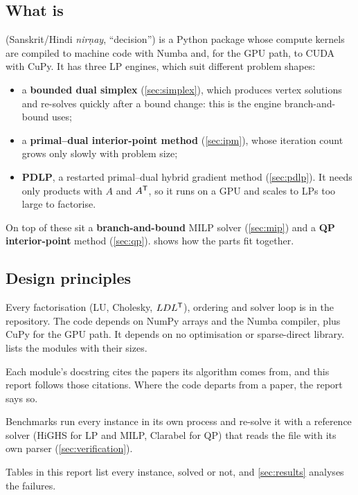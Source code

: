 \subsection{What \nirnay{} is}
\nirnay{} (Sanskrit/Hindi \emph{nirṇay}, ``decision'') is a Python package whose compute
kernels are compiled to machine code with Numba and, for the GPU path, to CUDA with CuPy. It has
three LP engines, which suit different problem shapes:
\begin{itemize}
  \item a \textbf{bounded dual simplex} (\cref{sec:simplex}), which produces vertex solutions and
        re-solves quickly after a bound change: this is the engine branch-and-bound uses;
  \item a \textbf{primal--dual interior-point method} (\cref{sec:ipm}), whose iteration count
        grows only slowly with problem size;
  \item \textbf{PDLP}, a restarted primal--dual hybrid gradient method (\cref{sec:pdlp}). It needs
        only products with $A$ and $A^{\mathsf{T}}$, so it runs on a GPU and scales to LPs too large to
        factorise.
\end{itemize}
On top of these sit a \textbf{branch-and-bound} MILP solver (\cref{sec:mip}) and a \textbf{QP
interior-point} method (\cref{sec:qp}).  shows how the parts fit together.

\subsection{Design principles}
\begin{description}[style=nextline,leftmargin=1.2em,font=\sffamily\bfseries\color{navy}]
  \item[Implement, do not wrap.] Every factorisation (LU, Cholesky, $LDL^{\mathsf{T}}$), ordering and
        solver loop is in the repository. The code depends on NumPy arrays and the Numba
        compiler, plus CuPy for the GPU path. It depends on no optimisation or sparse-direct
        library.  lists the modules with their sizes.
  \item[Follow the primary literature.] Each module's docstring cites the papers its algorithm
        comes from, and this report follows those citations. Where the code departs from a
        paper, the report says so.
  \item[Verify every answer independently.] Benchmarks run every instance in its own process
        and re-solve it with a reference solver (HiGHS for LP and MILP, Clarabel for QP) that
        reads the file with its own parser (\cref{sec:verification}).
  \item[Report failures.] Tables in this report list every instance, solved or not, and
        \cref{sec:results} analyses the failures.
\end{description}

